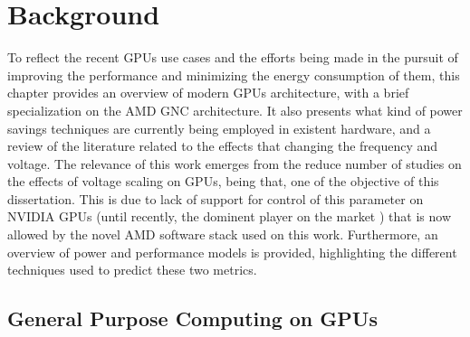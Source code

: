 
\chapter{Background}
\label{chapter:stateoftheart}


To reflect the recent GPUs use cases and the efforts being made in the pursuit of improving the performance and minimizing the energy consumption of them, this chapter provides an overview of modern GPUs architecture, with a brief specialization on the AMD GNC architecture. It also presents what kind of power savings techniques are currently being employed in existent hardware, and a review of the literature related to the effects that changing the frequency and voltage. The relevance of this work emerges from the reduce number of studies on the effects of voltage scaling on GPUs, being that, one of the objective of this dissertation. This is due to lack of support for control of this parameter on NVIDIA GPUs (until recently, the dominent player on the market \cite{noauthor_jon_nodate} \cite{mujtaba_amd_2019}) that is now allowed by the novel AMD software stack used on this work. Furthermore, an overview of power and performance models is provided, highlighting the different techniques used to predict these two metrics. 


\section{General Purpose Computing on GPUs}
\label{section:gpuarch}

